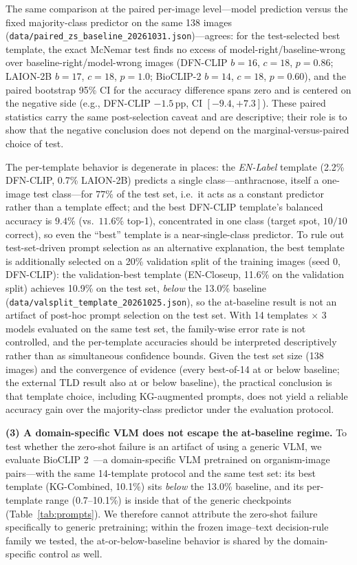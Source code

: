 \documentclass[10pt,a4paper]{article}
\begin{document}
The same comparison at the paired per-image level---model prediction versus the fixed majority-class predictor on the same 138 images (\texttt{data/paired\_zs\_baseline\_20261031.json})---agrees: for the test-selected best template, the exact McNemar test finds no excess of model-right/baseline-wrong over baseline-right/model-wrong images (DFN-CLIP $b{=}16$, $c{=}18$, $p{=}0.86$; LAION-2B $b{=}17$, $c{=}18$, $p{=}1.0$; BioCLIP-2 $b{=}14$, $c{=}18$, $p{=}0.60$), and the paired bootstrap 95\% CI for the accuracy difference spans zero and is centered on the negative side (e.g., DFN-CLIP $-1.5$\,pp, CI $[-9.4, +7.3]$). These paired statistics carry the same post-selection caveat and are descriptive; their role is to show that the negative conclusion does not depend on the marginal-versus-paired choice of test.

The per-template behavior is degenerate in places: the \emph{EN-Label} template (2.2\% DFN-CLIP, 0.7\% LAION-2B) predicts a single class---anthracnose, itself a one-image test class---for $77\%$ of the test set, i.e.\ it acts as a constant predictor rather than a template effect; and the best DFN-CLIP template's balanced accuracy is $9.4\%$ (vs.\ $11.6\%$ top-1), concentrated in one class (target spot, $10/10$ correct), so even the ``best'' template is a near-single-class predictor.
To rule out test-set-driven prompt selection as an alternative explanation, the best template is additionally selected on a 20\% validation split of the training images (seed 0, DFN-CLIP): the validation-best template (EN-Closeup, 11.6\% on the validation split) achieves 10.9\% on the test set, \emph{below} the 13.0\% baseline (\texttt{data/valsplit\_template\_20261025.json}), so the at-baseline result is not an artifact of post-hoc prompt selection on the test set.
With 14 templates $\times$ 3 models evaluated on the same test set, the family-wise error rate is not controlled, and the per-template accuracies should be interpreted descriptively rather than as simultaneous confidence bounds.
Given the test set size (138 images) and the convergence of evidence (every best-of-14 at or below baseline; the external TLD result also at or below baseline), the practical conclusion is that template choice, including KG-augmented prompts, does not yield a reliable accuracy gain over the majority-class predictor under the evaluation protocol.

\textbf{(3) A domain-specific VLM does not escape the at-baseline regime.}
To test whether the zero-shot failure is an artifact of using a generic VLM, we evaluate BioCLIP 2~\cite{bioclip2}---a domain-specific VLM pretrained on organism-image pairs---with the same 14-template protocol and the same test set: its best template (KG-Combined, 10.1\%) sits \emph{below} the 13.0\% baseline, and its per-template range (0.7--10.1\%) is inside that of the generic checkpoints (Table~\ref{tab:prompts}).
We therefore cannot attribute the zero-shot failure specifically to generic pretraining; within the frozen image--text decision-rule family we tested, the at-or-below-baseline behavior is shared by the domain-specific control as well.
\end{document}
